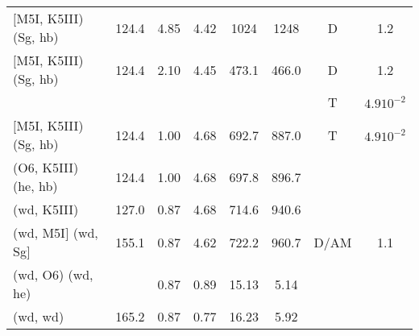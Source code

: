 \documentclass{article}
\begin{document}
\begin{table}
\begin{tabular}{p{4cm}ccccccc}
$[$M5I, K5III) (Sg, hb)	& 124.4	& 4.85	& 4.42	& 1024 	& 1248 	& D	& 1.2          		\\
$[$M5I, K5III) (Sg, hb)	& 124.4	& 2.10	& 4.45	& 473.1	& 466.0	& D	& 1.2          		\\
			&	& 	&	&	&	& T	& $4.9 10^{-2}$		\\
$[$M5I, K5III) (Sg, hb)	& 124.4	& 1.00	& 4.68	& 692.7	& 887.0	& T	& $4.9 10^{-2}$		\\
(O6, K5III) (he, hb)	& 124.4	& 1.00	& 4.68	& 697.8	& 896.7	&  	&              		\\
(wd, K5III)         	& 127.0	& 0.87	& 4.68	& 714.6	& 940.6	&  	&              		\\
(wd, M5I$]$ (wd, Sg$]$	& 155.1	& 0.87	& 4.62	& 722.2	& 960.7	& D/AM	& 1.1          		\\
(wd, O6) (wd, he)	&      	& 0.87	& 0.89	& 15.13	& 5.14	& 	&              		\\
(wd, wd)         	& 165.2 & 0.87	& 0.77	& 16.23	& 5.92	& 	&              		\\
\hline
\end{tabular}
\end{table}
\end{document}
